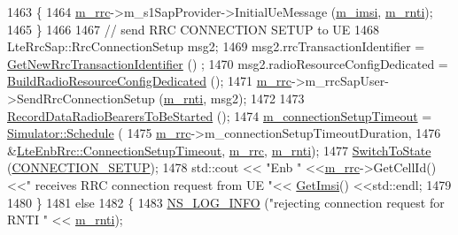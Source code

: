 \begin{DoxyCode}
1463               \{
1464                 \hyperlink{classns3_1_1UeManager_ab4405e9f354c66e7c1a4c95832290f5b}{m\_rrc}->m\_s1SapProvider->InitialUeMessage (\hyperlink{classns3_1_1UeManager_a868dda076ecfc1d4202e357c16223d84}{m\_imsi}, 
      \hyperlink{classns3_1_1UeManager_a5a72b4fe818f21993bd7f05d7e2c4f83}{m\_rnti});
1465               \}
1466 
1467             \textcolor{comment}{// send RRC CONNECTION SETUP to UE}
1468             LteRrcSap::RrcConnectionSetup msg2;
1469             msg2.rrcTransactionIdentifier = \hyperlink{classns3_1_1UeManager_a87e1b280b80dbd9e1aa0f91994882057}{GetNewRrcTransactionIdentifier} ()
      ;  
1470             msg2.radioResourceConfigDedicated = 
      \hyperlink{classns3_1_1UeManager_ad5933233e726bf7443714ecb261358f0}{BuildRadioResourceConfigDedicated} ();
1471             \hyperlink{classns3_1_1UeManager_ab4405e9f354c66e7c1a4c95832290f5b}{m\_rrc}->m\_rrcSapUser->SendRrcConnectionSetup (\hyperlink{classns3_1_1UeManager_a5a72b4fe818f21993bd7f05d7e2c4f83}{m\_rnti}, msg2);
1472 
1473             \hyperlink{classns3_1_1UeManager_a104d92b26b4b7fe93099d74080f62ae3}{RecordDataRadioBearersToBeStarted} ();
1474             \hyperlink{classns3_1_1UeManager_afa30ea647e5d93b6c58d46b92e681044}{m\_connectionSetupTimeout} = 
      \hyperlink{classns3_1_1Simulator_a671882c894a08af4a5e91181bf1eec13}{Simulator::Schedule} (
1475                 \hyperlink{classns3_1_1UeManager_ab4405e9f354c66e7c1a4c95832290f5b}{m\_rrc}->m\_connectionSetupTimeoutDuration,
1476                 &\hyperlink{classns3_1_1LteEnbRrc_ac0af0fbbf09bc66c0ebd5be00c69aa7c}{LteEnbRrc::ConnectionSetupTimeout}, 
      \hyperlink{classns3_1_1UeManager_ab4405e9f354c66e7c1a4c95832290f5b}{m\_rrc}, \hyperlink{classns3_1_1UeManager_a5a72b4fe818f21993bd7f05d7e2c4f83}{m\_rnti});
1477             \hyperlink{classns3_1_1UeManager_af2b5ad90fc6f16ffc4a91fbe8a522472}{SwitchToState} (\hyperlink{classns3_1_1UeManager_a2f4085fdd18d7125c27da44a5b8b6808a54b5e529e9da2b99970d8939dbd9832e}{CONNECTION\_SETUP});
1478             std::cout << \textcolor{stringliteral}{"Enb "} <<\hyperlink{classns3_1_1UeManager_ab4405e9f354c66e7c1a4c95832290f5b}{m\_rrc}->GetCellId()<<\textcolor{stringliteral}{" receives RRC connection request from UE "}<< 
      \hyperlink{classns3_1_1UeManager_a9609913bb407b13da17a55d9013e8e10}{GetImsi}() <<std::endl;
1479 
1480           \}
1481         \textcolor{keywordflow}{else}
1482           \{
1483             \hyperlink{group__logging_gafbd73ee2cf9f26b319f49086d8e860fb}{NS\_LOG\_INFO} (\textcolor{stringliteral}{"rejecting connection request for RNTI "} << 
      \hyperlink{classns3_1_1UeManager_a5a72b4fe818f21993bd7f05d7e2c4f83}{m\_rnti});

\end{DoxyCode}

